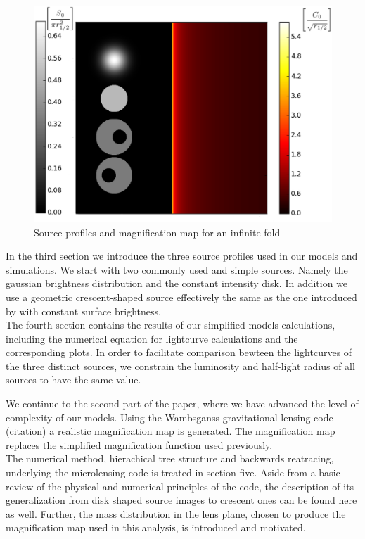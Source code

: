 \begin{figure}
\includegraphics[width = .8\textwidth]{plots/infinite_fold.eps}
\caption{\label{fig:infinite_fold}  Source profiles and magnification map for an infinite fold}
\end{figure}




In the third section we introduce the three source profiles used in our models and simulations. We start with two commonly used and simple sources. Namely the gaussian brightness distribution and the constant intensity disk. In addition we use a geometric crescent-shaped source effectively the same as the one introduced by \citep{2013MNRAS.434..765K} with constant surface brightness. \\
The fourth section contains the results of our simplified models calculations, including the numerical equation for lightcurve calculations and the corresponding plots. In order to facilitate comparison bewteen the lightcurves of the three distinct sources, we constrain the luminosity and half-light radius of all sources to have the same value.    
       
We continue to the second part of the paper, where we have advanced the level of complexity of our models. Using the Wambsganss gravitational lensing code (citation) a realistic magnification map is generated. The magnification map replaces the simplified magnification function used previously.  \\
The numerical method, hierachical tree structure and backwards reatracing, underlying the microlensing code is treated in section five. Aside from a basic review of the physical and numerical principles of the code, the description of its generalization from disk shaped source images to crescent ones can be found here as well. Further, the mass distribution in the lens plane, chosen to produce the magnification map used in this analysis, is introduced and motivated.   
